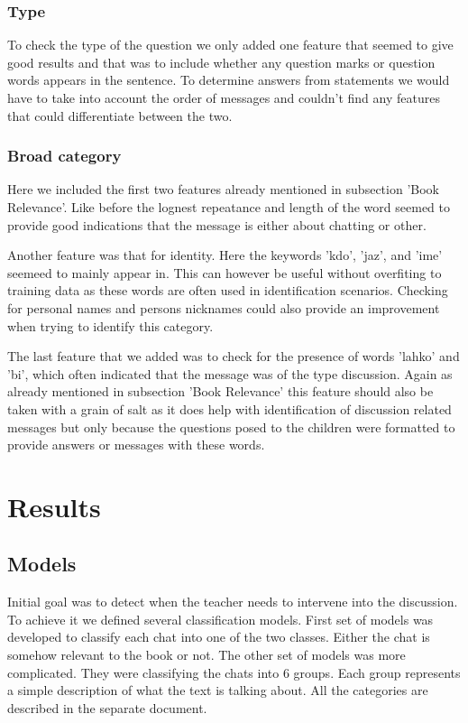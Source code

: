 \documentclass[11pt,a4paper]{article}
\begin{document}
\subsubsection{Type}

To check the type of the question we only added one feature that seemed to give good results and that was to include whether any question marks or question words appears in the sentence.
To determine answers from statements we would have to take into account the order of messages and couldn't find any features that could differentiate between the two.

\subsubsection{Broad category}

Here we included the first two features already mentioned in subsection 'Book Relevance'.
Like before the lognest repeatance and length of the word seemed to provide good indications that the message is either about chatting or other.

Another feature was that for identity.
Here the keywords 'kdo', 'jaz', and 'ime' seemeed to mainly appear in.
This can however be useful without overfiting to training data as these words are often used in identification scenarios.
Checking for personal names and persons nicknames could also provide an improvement when trying to identify this category.

The last feature that we added was to check for the presence of words 'lahko' and 'bi', which often indicated that the message was of the type discussion.
Again as already mentioned in subsection 'Book Relevance' this feature should also be taken with a grain of salt as it does help with identification of discussion related messages but only because the questions posed to the children were formatted to provide answers or messages with these words. 

\section{Results} 

\subsection{Models}
Initial goal was to detect when the teacher needs to intervene into the discussion.
To achieve it we defined several classification models.
First set of models was developed to classify each chat into one of the two classes.
Either the chat is somehow relevant to the book or not.
The other set of models was more complicated.
They were classifying the chats into 6 groups.
Each group represents a simple description of what the text is talking about.
All the categories are described in the separate document. %
\end{document}
